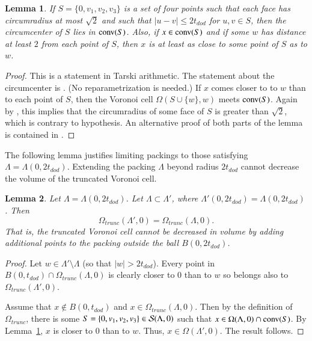 \documentclass{article} %
\newtheorem{lemma}{Lemma}[subsection]
\begin{document}
\begin{lemma}\label{lemma:Q}
If $S=\{0,v_1,v_2,v_3\}$ is a set of four points such that each
face has circumradius at most $\sqrt2$ and such that
$|u-v|\le 2t_{dod}$ for $u,v\in S$, then
the circumcenter of $S$ lies in ${\operatorname{conv}}(S)$.  Also, if $x
\in {\operatorname{conv}}(S)$ and if some $w$ has distance at least $2$ from each
point of $S$, then $x$ is at least as close to some point of $S$ as to
$w$.
\end{lemma}

\begin{proof} This is a statement in Tarski arithmetic.
The statement about the circumcenter is \cite[Lemma~5.18]{Hales:2006:DCG}.
(No reparametrization is needed.)
If $x$  comes closer to  to $w$  than to each point of $S$, then
the Voronoi cell $\Omega(S\cup\{w\},w)$ meets ${\operatorname{conv}}(S)$.
Again by \cite[Lemma~5.18]{Hales:2006:DCG}, this implies that the circumradius
of some face of $S$ is greater than $\sqrt2$, which is contrary
to hypothesis. An alternative proof 
of both parts of the lemma
is contained in \cite[Lemma~3.5,3.6]{Hales:2002:Dodec}.
\end{proof}

The following lemma justifies limiting packings to those
satisfying $\Lambda=\Lambda(0,2t_{dod})$.  Extending the packing
$\Lambda$ beyond radius $2t_{dod}$ cannot decrease the volume of the
truncated Voronoi cell.

\begin{lemma}\label{lemma:trunc}  
Let $\Lambda=\Lambda(0,2t_{dod})$.  Let $\Lambda\subset\Lambda'$,
where $\Lambda'(0,2t_{dod}) = \Lambda(0,2t_{dod})$.  Then
$$\Omega_{trunc}(\Lambda',0) = \Omega_{trunc}(\Lambda,0).
$$
That is, the truncated Voronoi cell cannot be decreased in volume by
adding additional points to the packing outside the ball $B(0,2t_{dod})$.
\end{lemma}

\begin{proof} Let $w\in \Lambda'\setminus\Lambda$ (so that  $|w|>2t_{dod}$).
Every point in $B(0,t_{dod})\cap \Omega_{trunc}(\Lambda,0)$ 
is clearly closer to $0$ than to $w$ so
belongs also to $\Omega_{trunc}(\Lambda',0)$.

Assume that $x\not\in B(0,t_{dod})$ and $x\in \Omega_{trunc}(\Lambda,0)$.
Then by the definition of $\Omega_{trunc}$,
there is some $S=\{0,v_1,v_2,v_3\}\in {\mathcal S}(\Lambda,0)$ such that
$x\in \Omega(\Lambda,0)\cap {\operatorname{conv}}(S)$.  By Lemma~\ref{lemma:Q},
$x$ is closer to $0$ than to $w$.  Thus, $x\in\Omega(\Lambda',0)$.
The result follows.
\end{proof}
\end{document}
